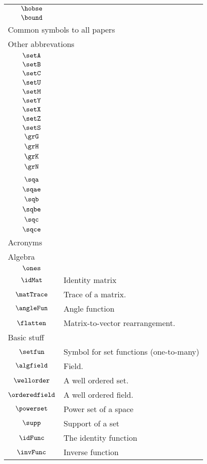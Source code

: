 \begin{longtable}{cl}
 $\hobse$ & \\ 
 $\bound$ & \\ 
 \multicolumn{2}{l}{Common symbols to all papers}\\ 
 \hline
\hline
\multicolumn{2}{l}{Other abbrevations}\\ 
 \hline
$\setA$ & \\ 
 $\setB$ & \\ 
 $\setC$ & \\ 
 $\setU$ & \\ 
 $\setM$ & \\ 
 $\setY$ & \\ 
 $\setX$ & \\ 
 $\setZ$ & \\ 
 $\setS$ & \\ 
 $\grG$ & \\ 
 $\grH$ & \\ 
 $\grK$ & \\ 
 $\grN$ & \\ 
 \multicolumn{2}{l}{}\\ 
 \hline
$\sqa$ & \\ 
 $\sqae$ & \\ 
 $\sqb$ & \\ 
 $\sqbe$ & \\ 
 $\sqc$ & \\ 
 $\sqce$ & \\ 
 \multicolumn{2}{l}{Acronyms}\\ 
 \hline
\multicolumn{2}{l}{Algebra}\\ 
 \hline
$\ones$ & \\ 
 $\idMat$ &  Identity matrix\\ 
 $\matTrace$ &  Trace of a matrix.\\ 
 $\angleFun$ &  Angle function\\ 
 $\flatten$ &  Matrix-to-vector rearrangement.\\ 
 \multicolumn{2}{l}{Basic stuff}\\ 
 \hline
$\setfun$ &  Symbol for set functions (one-to-many)\\ 
 $\algfield$ &  Field.\\ 
 $\wellorder$ &  A well ordered set.\\ 
 $\orderedfield$ &  A well ordered field.\\ 
 $\powerset$ &  Power set of a space\\ 
 $\supp$ &  Support of a set\\ 
 $\idFunc$ &  The identity function\\ 
 $\invFunc$ &  Inverse function \\ 

\end{longtable}
